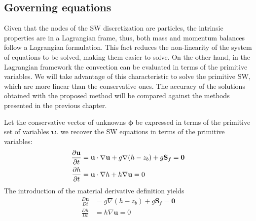 \subsection{Governing equations}


Given that the nodes of the SW discretization are particles, the intrinsic properties are in a Lagrangian frame, thus, both mass and momentum balances follow a Lagrangian formulation. This fact reduces the non-linearity of the system of equations to be solved, making them easier to solve. On the other hand, in the Lagrangian framework the convection can be evaluated in terms of the primitive variables. We will take advantage of this characteristic to solve the primitive SW, which are more linear than the conservative ones.
The accuracy of the solutions obtained with the proposed method will be compared against the methods presented in the previous chapter.

Let the conservative vector of unknowns $\bm\phi$ be expressed in terms of the primitive set of variables $\bm\psi$. we recover the SW equations in terms of the primitive variables:
\begin{subequations}
\begin{align}
    \frac{\partial\mathbf{u}}{\partial t} &= \mathbf{u} \cdot \nabla \mathbf{u} + g \nabla(h-z_b) + g\mathbf{S}_f = \mathbf{0} \\
    \frac{\partial h}{\partial t} &= \mathbf{u} \cdot \nabla h + h \nabla \mathbf{u} = 0
\end{align}
\end{subequations}
The introduction of the material derivative definition yields
\begin{subequations} \label{pfem_mat_balance}
\begin{align}
    \frac{D\mathbf{u}}{Dt} &= g \nabla(h-z_b) + g\mathbf{S}_f = \mathbf{0} \\
    \frac{Dh}{Dt} &= h \nabla \mathbf{u} = 0
\end{align}
\end{subequations}

